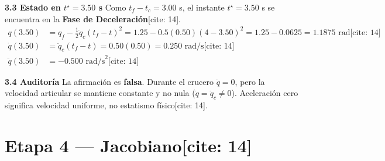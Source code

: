 \documentclass[11pt, a4paper]{article}
\begin{document}
\textbf{3.3 Estado en $t^\star = 3.50$ s}
Como $t_f - t_c = 3.00$ s, el instante $t^\star = 3.50$ s se encuentra en la \textbf{Fase de Deceleración}[cite: 14].
\begin{align*}
    q(3.50) &= q_f - \frac{1}{2}\ddot{q}_c(t_f - t)^2 = 1.25 - 0.5(0.50)(4 - 3.50)^2 = 1.25 - 0.0625 = \boxed{ 1.1875 \text{ rad} } \text{[cite: 14]} \\
    \dot{q}(3.50) &= \ddot{q}_c(t_f - t) = 0.50(0.50) = \boxed{ 0.250 \text{ rad/s} } \text{[cite: 14]} \\
    \ddot{q}(3.50) &= \boxed{ -0.500 \text{ rad/s}^2 } \text{[cite: 14]}
\end{align*}

\textbf{3.4 Auditoría}
La afirmación es \textbf{falsa}. Durante el crucero $\ddot{q}=0$, pero la velocidad articular se mantiene constante y no nula ($\dot{q} = \dot{q}_c \neq 0$). Aceleración cero significa velocidad uniforme, no estatismo físico[cite: 14].

\section*{Etapa 4 — Jacobiano[cite: 14]}
\end{document}
